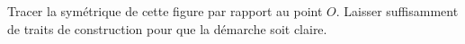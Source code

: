 
\begin{exercice}\label{exo2smath-0081}

    Tracer la symétrique de cette figure par rapport au point \( O\). Laisser suffisamment de traits de construction pour que la démarche soit claire.

\begin{center}
   
\end{center}


\end{exercice}

